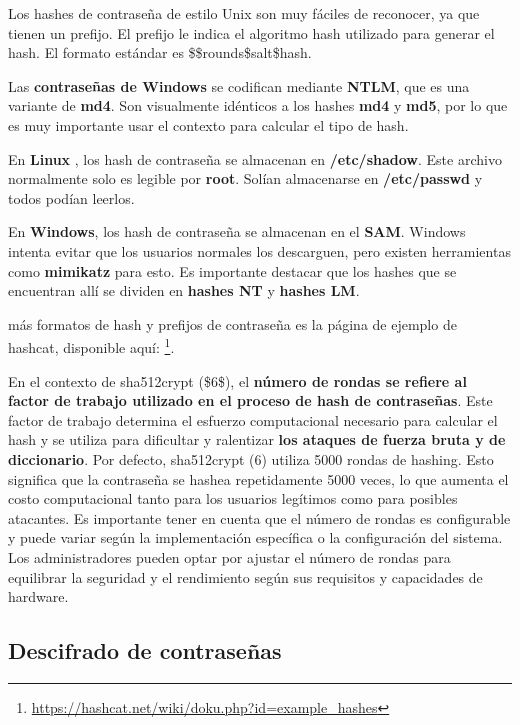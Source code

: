 Los hashes de contraseña de estilo Unix son muy fáciles de reconocer, ya que tienen un prefijo. El prefijo le indica el algoritmo hash utilizado para generar el hash. El formato estándar es \$\format\$rounds\$salt\$hash.

Las \textbf{contraseñas de Windows} se codifican mediante \textbf{NTLM}, que es una variante de \textbf{md4}. Son visualmente idénticos a los hashes \textbf{md4} y \textbf{md5}, por lo que es muy importante usar el contexto para calcular el tipo de hash.

En \textbf{Linux} , los hash de contraseña se almacenan en \textbf{/etc/shadow}. Este archivo normalmente solo es legible por \textbf{root}. Solían almacenarse en \textbf{/etc/passwd} y todos podían leerlos.

En \textbf{Windows}, los hash de contraseña se almacenan en el \textbf{SAM}. Windows intenta evitar que los usuarios normales los descarguen, pero existen herramientas como \textbf{mimikatz} para esto. Es importante destacar que los hashes que se encuentran allí se dividen en \textbf{hashes NT} y \textbf{hashes LM}.

más formatos de hash y prefijos de contraseña es la página de ejemplo de hashcat, disponible aquí:  \footnote{\url{https://hashcat.net/wiki/doku.php?id=example_hashes}}.


\begin{tcolorbox}[colback=gray!5!white,colframe=orange!60!gray,title= ¿Cuántas rondas utiliza sha512crypt (\$6\$) de forma predeterminada?]
En el contexto de sha512crypt (\$6\$), el \textbf{número de rondas se refiere al factor de trabajo utilizado en el proceso de hash de contraseñas}. Este factor de trabajo determina el esfuerzo computacional necesario para calcular el hash y se utiliza para dificultar y ralentizar \textbf{los ataques de fuerza bruta y de diccionario}.
%
Por defecto, sha512crypt ($6$) utiliza 5000 rondas de hashing. Esto significa que la contraseña se hashea repetidamente 5000 veces, lo que aumenta el costo computacional tanto para los usuarios legítimos como para posibles atacantes.
%
Es importante tener en cuenta que el número de rondas es configurable y puede variar según la implementación específica o la configuración del sistema. Los administradores pueden optar por ajustar el número de rondas para equilibrar la seguridad y el rendimiento según sus requisitos y capacidades de hardware.
\end{tcolorbox}

\subsection{Descifrado de contraseñas}


